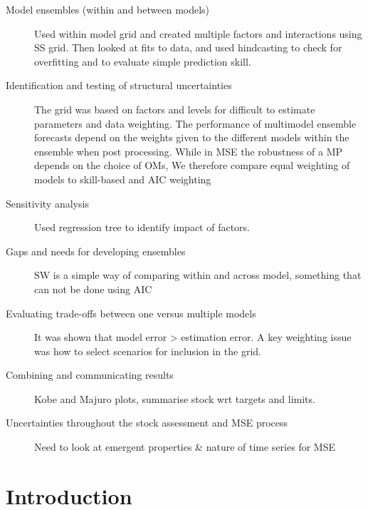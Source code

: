 \documentclass[a4paper]{article}
\begin{document}
\begin{description}
    \item[Model ensembles (within and between models)]
    Used within model grid and created multiple factors and interactions using SS grid.  Then looked at fits to data, and used hindcasting to check for overfitting and to evaluate simple prediction skill.
    \item[Identification and testing of structural uncertainties]
    The grid was based on factors and levels for difficult to estimate parameters and data weighting. The performance of multimodel ensemble forecasts depend on the weights given to the different models within the ensemble when post processing. While in MSE the robustness of a MP depends on the choice of OMs, We therefore compare equal weighting of models to skill-based and AIC weighting
    \item[Sensitivity analysis]
    Used regression tree to identify impact of factors.
    \item[Gaps and needs for developing ensembles]
    SW is a simple way of comparing within and across model, something that can not be done using AIC
    \item[Evaluating trade-offs between one versus multiple models] It was shown that model error > estimation error. A key weighting issue was how to select scenarios for inclusion in the grid.
    \item[Combining and communicating results]
    Kobe and Majuro plots, summarise stock wrt targets and limits.
    \item[Uncertainties throughout the stock assessment and MSE process] Need to look at emergent properties \& nature of time series for MSE
\end{description}

\newpage
\section*{Introduction}
\end{document}
